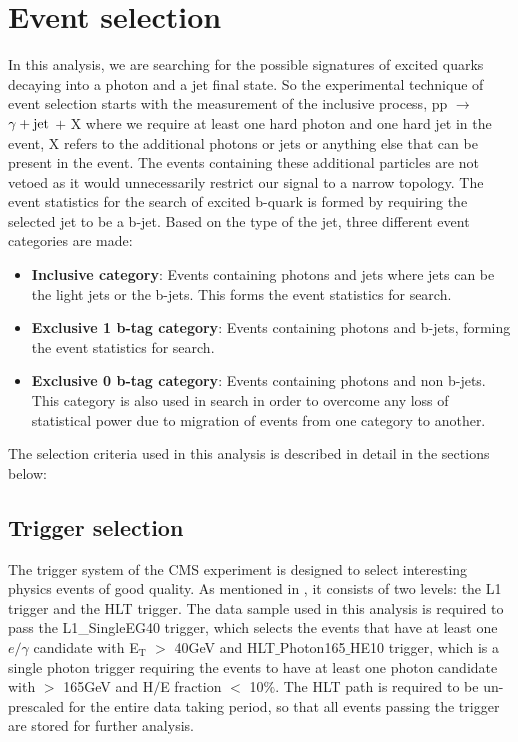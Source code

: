 \section{Event selection}
In this analysis, we are searching for the possible signatures of excited quarks decaying into a photon and a jet final state. So the experimental technique of
event selection starts with the measurement of the inclusive process, pp $\rightarrow$ $\gamma+\mathrm{jet}$ $+$ X where we require at least one hard photon and one hard jet
in the event, X refers to the additional photons or jets or anything else that can be present in the event. The events containing these additional particles are
not vetoed as it would unnecessarily restrict our signal to a narrow topology. The event statistics for the search of excited b-quark is formed by requiring the selected
jet to be a b-jet. Based on the type of the jet, three different event categories are made:
\vspace{-0.1in}
\begin{itemize}[leftmargin=*]
\item {\bf{Inclusive category}}: Events containing photons and jets where jets can be the light jets or the b-jets. This forms the event statistics for \qstar
  search.
\item {\bf{Exclusive 1 b-tag category}}: Events containing photons and b-jets, forming the event statistics for \bstar search.
\item {\bf{Exclusive 0 b-tag category}}: Events containing photons and non b-jets. This category is also used in \bstar search in order to overcome
  any loss of statistical power due to migration of events from one category to another.
\end{itemize}
\vspace{-0.1in}
The selection criteria used in this analysis is described in detail in the sections below:
\subsection{Trigger selection}
The trigger system of the CMS experiment is designed to select interesting physics events of good quality. As mentioned in \sectn{\ref{Se:CMS_trigger}}, it
consists of two levels: the L1 trigger and the HLT trigger. The data sample used in this analysis is required to pass the L1\_SingleEG40 trigger, which
selects the events that have at least one $e/\gamma$ candidate with E$_{\textrm{T}}$ $>$ 40\unit{GeV} and HLT$\_$Photon165$\_$HE10 trigger, which is a single
photon trigger requiring the events to have at least one photon candidate with \pt $>$ 165\unit{GeV} and H$/$E fraction $<$ 10$\%$. The HLT path is
required to be un-prescaled for the entire data taking period, so that all events passing the trigger are stored for further analysis.

